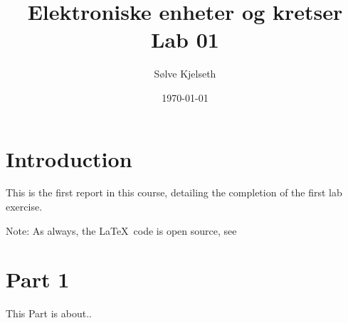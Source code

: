 \documentclass{article}
\title{\fontsize{24}{36}\selectfont Elektroniske enheter og kretser\\ %
Lab 01} %
\author{{\ttfamily Sølve Kjelseth}} %
\date{\today} %
\begin{document}
\maketitle %



\section{Introduction} %
This is the first report in this course, detailing the completion of the first lab exercise.\par
Note: As always, the \LaTeX\ code is open source, see

\clearpage
\tableofcontents %
\hfill
\listoffigures %
\hfill
\listoftables %



\section{Part 1}
This Part is about..
\end{document}
